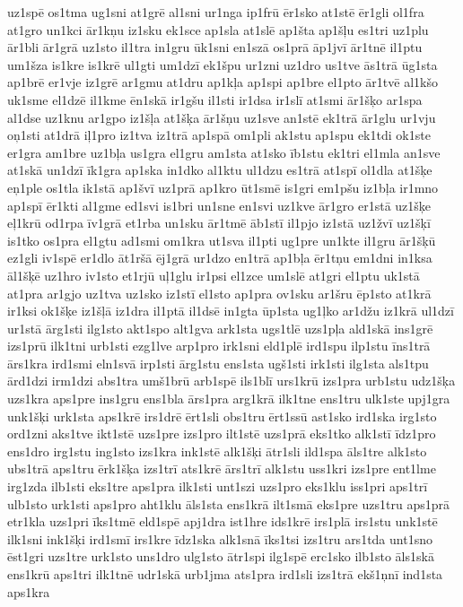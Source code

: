 {uz1spē
os1tma
ug1sni
at1grē
al1sni
ur1nga
ip1frū
ēr1sko
at1stē
ēr1gli
ol1fra
at1gro
un1kci
ār1kņu
iz1sku
ek1sce
ap1sla
at1slē
ap1šta
ap1šļu
es1tri
uz1plu
ār1bli
ār1grā
uz1sto
il1tra
in1gru
ūk1sni
en1szā
os1prā
āp1jvī
ār1tnē
il1ptu
um1šza
is1kre
is1krē
ul1gti
um1dzī
ek1špu
ur1zni
uz1dro
us1tve
ās1trā
ūg1sta
ap1brē
er1vje
iz1grē
ar1gmu
at1dru
ap1kļa
ap1spi
ap1bre
el1pto
ār1tvē
al1kšo
uk1sme
el1dzē
il1kme
ēn1skā
ir1gšu
il1sti
ir1dsa
ir1slī
at1smi
ār1šķo
ar1spa
al1dse
uz1knu
ar1gpo
iz1šļa
at1šķa
ār1šņu
uz1sve
an1stē
ek1trā
ār1glu
ur1vju
oņ1sti
at1drā
iļ1pro
iz1tva
iz1trā
ap1spā
om1pli
ak1stu
ap1spu
ek1tdi
ok1ste
er1gra
am1bre
uz1bļa
us1gra
el1gru
am1sta
at1sko
īb1stu
ek1tri
el1mla
an1sve
at1skā
un1dzī
īk1gra
ap1ska
in1dko
al1ktu
ul1dzu
es1trā
at1spī
ol1dla
at1šķe
eņ1ple
os1tla
ik1stā
ap1švī
uz1prā
ap1kro
ūt1smē
is1gri
em1pšu
iz1bļa
ir1mno
ap1spī
ēr1kti
al1gme
ed1svi
is1bri
un1sne
en1svi
uz1kve
ār1gro
er1stā
uz1šķe
eļ1krū
od1rpa
īv1grā
et1rba
un1sku
ār1tmē
āb1stī
il1pjo
iz1stā
uz1žvī
uz1šķī
is1tko
os1pra
el1gtu
ad1smi
om1kra
ut1sva
il1pti
ug1pre
un1kte
il1gru
ār1šķū
ez1gli
iv1spē
er1dlo
āt1ršā
ēj1grā
ur1dzo
en1trā
ap1bļa
ēr1tņu
em1dni
in1ksa
āl1šķē
uz1hro
iv1sto
et1rjū
uļ1glu
ir1psi
el1zce
um1slē
at1gri
el1ptu
uk1stā
at1pra
ar1gjo
uz1tva
uz1sko
iz1stī
el1sto
ap1pra
ov1sku
ar1šru
ēp1sto
at1krā
ir1ksi
ok1šķe
iz1šļā
iz1dra
il1ptā
il1dsē
in1gta
ūp1sta
ug1ļko
ar1džu
iz1krā
ul1dzī
ur1stā
ārg1sti
ilg1sto
akt1spo
alt1gva
ark1sta
ugs1tlē
uzs1pļa
ald1skā
ins1grē
izs1prū
ilk1tni
urb1sti
ezg1lve
arp1pro
irk1sni
eld1plē
ird1spu
ilp1stu
īns1trā
ārs1kra
ird1smi
eln1svā
irp1sti
ārg1stu
ens1sta
ugš1sti
irk1sti
ilg1sta
als1tpu
ārd1dzi
irm1dzi
abs1tra
umš1brū
arb1spē
ils1blī
urs1krū
izs1pra
urb1stu
udz1šķa
uzs1kra
aps1pre
ins1gru
ens1bla
ārs1pra
arg1krā
ilk1tne
ens1tru
ulk1ste
upj1gra
unk1šķi
urk1sta
aps1krē
irs1drē
ērt1sli
obs1tru
ērt1ssū
ast1sko
ird1ska
irg1sto
ord1zni
aks1tve
ikt1stē
uzs1pre
izs1pro
ilt1stē
uzs1prā
eks1tko
alk1stī
īdz1pro
ens1dro
irg1stu
ing1sto
izs1kra
ink1stē
alk1šķi
ātr1sli
ild1spa
āls1tre
alk1sto
ubs1trā
aps1tru
ērk1šķa
izs1trī
ats1krē
ārs1trī
alk1stu
uss1kri
izs1pre
ent1lme
irg1zda
ilb1sti
eks1tre
aps1pra
ilk1sti
unt1szi
uzs1pro
eks1klu
iss1pri
aps1trī
ulb1sto
urk1sti
aps1pro
aht1klu
āls1sta
ens1krā
ilt1smā
eks1pre
uzs1tru
aps1prā
etr1kla
uzs1pri
īks1tmē
eld1spē
apj1dra
ist1hre
ids1krē
irs1plā
irs1stu
unk1stē
ilk1sni
ink1šķi
ird1smī
irs1kre
īdz1ska
alk1snā
īks1tsi
izs1tru
ars1tda
unt1sno
ēst1gri
uzs1tre
urk1sto
uns1dro
ulg1sto
ātr1spi
ilg1spē
erc1sko
ilb1sto
āls1skā
ens1krū
aps1tri
ilk1tnē
udr1skā
urb1jma
ats1pra
ird1sli
izs1trā
ekš1ņnī
ind1sta
aps1kra
}
